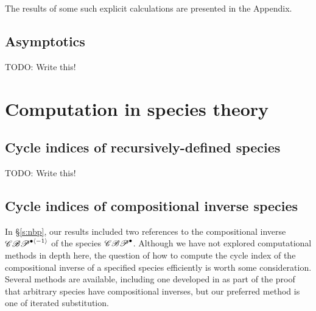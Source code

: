 \documentclass[sectionflow,singlespace,twoside,boldmathhdr]{brandiss} %
\numberwithin{section}{chapter}
\numberwithin{figure}{chapter}
\begin{document}
The results of some such explicit calculations are presented in the Appendix.

\section{Asymptotics}
TODO: Write this!

\appendix
\chapter{Computation in species theory}\label{c:comp}
\section{Cycle indices of recursively-defined species}\label{c:comprecurs}
TODO: Write this!

\section{Cycle indices of compositional inverse species}\label{s:compinv}
In \S \ref{s:nbp}, our results included two references to the compositional inverse $\mathscr{CBP}^{\bullet \left\langle {-1} \right\rangle}$ of the species $\mathscr{CBP}^{\bullet}$.
Although we have not explored computational methods in depth here, the question of how to compute the cycle index of the compositional inverse of a specified species efficiently is worth some consideration.
Several methods are available, including one developed in \cite[4.2.19]{bll:species} as part of the proof that arbitrary species have compositional inverses, but our preferred method is one of iterated substitution.
\end{document}
